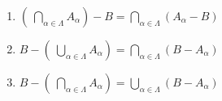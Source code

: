 \begin{enumerate}
\begin{enumerate}
\item $\left(\:\bigcap\limits_{\alpha \in \Lambda}^{}A_{\alpha} \right) - B 
= \bigcap\limits_{\alpha \in \Lambda}^{} \left( A_{\alpha} - B \right)$

\item $B - \left(\:\bigcup\limits_{\alpha \in \Lambda}^{}A_{\alpha} \right) 
= \bigcap\limits_{\alpha \in \Lambda}^{} \left( B - A_{\alpha} \right)$

\item $B - \left(\:\bigcap\limits_{\alpha \in \Lambda}^{}A_{\alpha} \right) 
= \bigcup\limits_{\alpha \in \Lambda}^{} \left( B - A_{\alpha} \right)$

\end{enumerate}
\end{enumerate}



